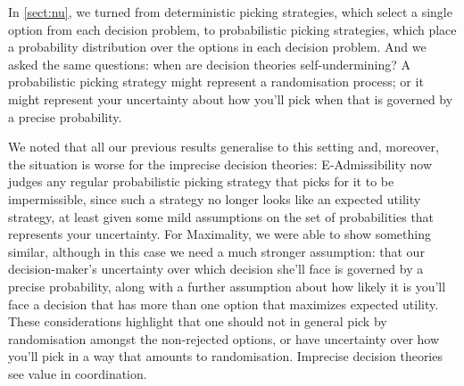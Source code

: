 \documentclass[a4paper,final]{article}
\newcommand\EU{\mathrm{EU}}
\newcommand{\todoold}[2][]{\todo[backgroundcolor=white,bordercolor=orange!10,linecolor=gray!10, #1,caption={},textcolor=gray]{Pre-rev: #2}}
\newenvironment{CCM rewritten}
{\begingroup\color{blue}} %
{\endgroup}              %
\begin{document}

In \cref{sect:nu}, we turned from deterministic picking strategies, which select a single option from each decision problem, to probabilistic picking strategies, which place a probability distribution over the options in each decision problem. And we asked the same questions: when are decision theories self-undermining? A probabilistic picking strategy might represent a randomisation process; or it might represent your uncertainty about how you'll pick when that is governed by a precise probability.%

We noted that all our previous results generalise to this setting and, moreover, the situation is worse for the imprecise decision theories:
 E-Admissibility now judges any regular probabilistic picking strategy that picks for it to be impermissible, since such a strategy no longer looks like an expected utility strategy, at least given some mild assumptions on the set of probabilities that represents your uncertainty. 
For Maximality, we were able to show something similar, although in this case we need a much stronger assumption: that our decision-maker's uncertainty over which decision she'll face is governed by a precise probability, along with a further assumption about how likely it is you'll face a decision that has more than one option that maximizes expected utility. %
	These considerations highlight that one should not in general pick by randomisation amongst the non-rejected options, or have uncertainty over how you'll pick in a way that amounts to randomisation. Imprecise decision theories see value in coordination. %
\end{document}
